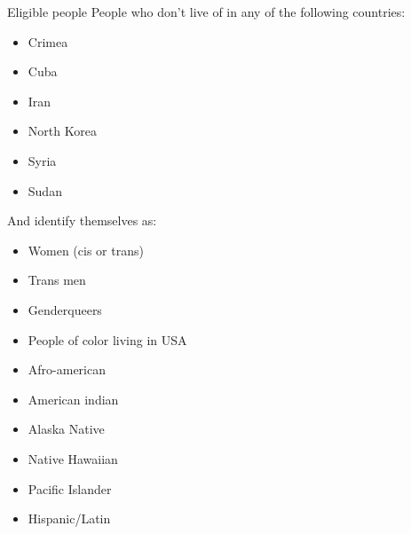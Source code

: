 \documentclass[pdf]{beamer}
\begin{document}
\begin{frame}{Eligible people}
  People who don't live of in any of the following countries:
  \vspace{1em}
  \begin{minipage}{.45\linewidth}
    \begin{itemize}
        \item Crimea
        \item Cuba
        \item Iran
    \end{itemize}
  \end{minipage}
  \hspace{.05\linewidth}
  \begin{minipage}{.45\linewidth}
    \begin{itemize}
        \item North Korea
        \item Syria
        \item Sudan
    \end{itemize}
  \end{minipage}

  \vspace{1em}
  And identify themselves as:
  \begin{itemize}
    \item Women (cis or trans)
    \item Trans men
    \item Genderqueers
    \item People of color living in USA
  \end{itemize}

  \begin{center}
    \begin{minipage}{.45\linewidth}
      \begin{itemize}
        \item Afro-american
        \item American indian
        \item Alaska Native
      \end{itemize}
    \end{minipage}
    \hspace{.05\linewidth}
    \begin{minipage}{.45\linewidth}
      \begin{itemize}
        \item Native Hawaiian
        \item Pacific Islander
        \item Hispanic/Latin
      \end{itemize}
    \end{minipage}
  \end{center}
\end{frame}
\end{document}
